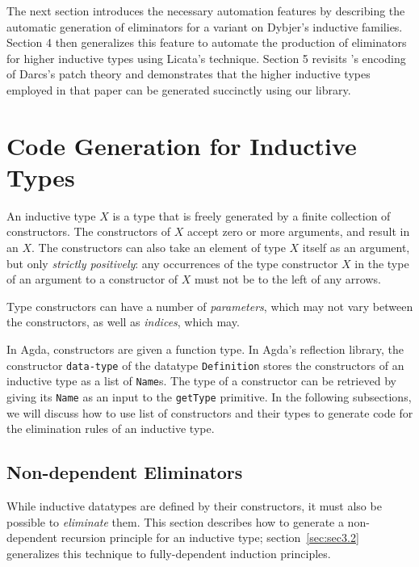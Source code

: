 \documentclass[sigplan,10pt]{acmart}
\begin{document}
The next section introduces the necessary automation features by describing the automatic generation of eliminators for a variant on Dybjer's inductive families. Section 4 then generalizes this feature to automate the production of eliminators for higher inductive types using Licata's technique. Section 5 revisits \citeauthor{Angiuli-2014}'s encoding of Darcs's patch theory \citep{Angiuli-2014} and demonstrates that the higher inductive types employed in that paper can be generated succinctly using our library.

\section{Code Generation for Inductive Types}
\label{sec:sec3}
An inductive type $X$ is a type that is freely generated by a finite collection of constructors. The constructors of $X$ accept zero or more arguments, and result in an $X$. The constructors can also take an element of type $X$ itself as an argument, but only \emph{strictly positively}: any occurrences of the type constructor $X$ in the type of an argument to a constructor of $X$ must not be to the left of any arrows.

Type constructors can have a number of \emph{parameters}, which may not vary between the constructors, as well as \emph{indices}, which may.


In Agda, constructors are given a function type. In Agda's reflection library, the constructor {\tt data-type} of the datatype {\tt Definition} stores the constructors of an inductive type as a list of \texttt{Name}s. The type of a constructor can be retrieved by giving its {\tt Name} as an input to the {\tt getType} primitive. In the following subsections, we will discuss how to use list of constructors and their types to generate code for the elimination rules of an inductive type.

\subsection{Non-dependent Eliminators}
\label{sec:sec3.1}

While inductive datatypes are defined by their constructors, it must also be possible to \emph{eliminate} them.
This section describes how to generate a non-dependent recursion principle for an inductive type; section~\ref{sec:sec3.2} generalizes this technique to fully-dependent induction principles.
\end{document}
